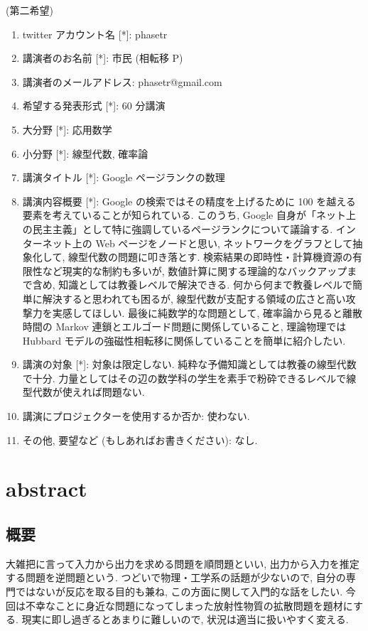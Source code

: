 \documentclass[openany, a4paper, oneside]{jsbook}
\begin{document}
(第二希望)
\begin{enumerate}
\item twitter アカウント名 [*]: phasetr
\item 講演者のお名前 [*]: 市民 (相転移 P)
\item 講演者のメールアドレス: phasetr@gmail.com
\item 希望する発表形式 [*]: 60 分講演
\item 大分野 [*]: 応用数学
\item 小分野 [*]: 線型代数, 確率論
\item 講演タイトル [*]: Google ページランクの数理
\item 講演内容概要 [*]: Google の検索ではその精度を上げるために 100 を越える要素を考えていることが知られている.
このうち, Google 自身が「ネット上の民主主義」として特に強調しているページランクについて議論する.
インターネット上の Web ページをノードと思い,
ネットワークをグラフとして抽象化して, 線型代数の問題に叩き落とす.
検索結果の即時性・計算機資源の有限性など現実的な制約も多いが,
数値計算に関する理論的なバックアップまで含め, 知識としては教養レベルで解決できる.
何から何まで教養レベルで簡単に解決すると思われても困るが,
線型代数が支配する領域の広さと高い攻撃力を実感してほしい.
最後に純数学的な問題として, 確率論から見ると離散時間の Markov 連鎖とエルゴード問題に関係していること,
理論物理では Hubbard モデルの強磁性相転移に関係していることを簡単に紹介したい.
\item 講演の対象 [*]: 対象は限定しない.
純粋な予備知識としては教養の線型代数で十分.
力量としてはその辺の数学科の学生を素手で粉砕できるレベルで線型代数が使えれば問題ない.
\item 講演にプロジェクターを使用するか否か: 使わない.
\item その他, 要望など (もしあればお書きください): なし.
\end{enumerate}
\section{abstract}

\subsection{概要}

大雑把に言って入力から出力を求める問題を順問題といい,
出力から入力を推定する問題を逆問題という.
つどいで物理・工学系の話題が少ないので, 自分の専門ではないが反応を取る目的も兼ね,
この方面に関して入門的な話をしたい.
今回は不幸なことに身近な問題になってしまった放射性物質の拡散問題を題材にする.
現実に即し過ぎるとあまりに難しいので, 状況は適当に扱いやすく変える.
\end{document}
